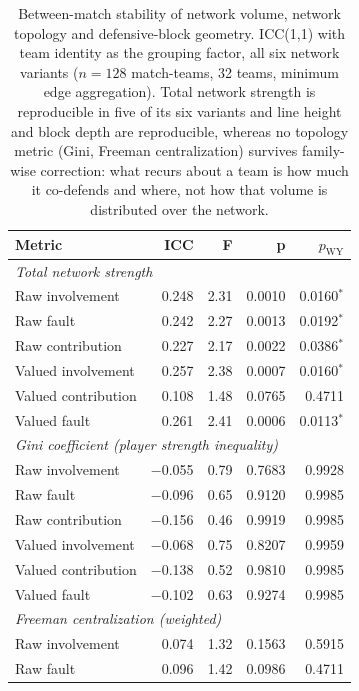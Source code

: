 \begin{table}[ht]
\centering
\caption{Between-match stability of network volume, network topology and
defensive-block geometry. ICC(1,1) with team identity as the grouping factor,
all six network variants ($n=128$ match-teams, 32 teams, minimum
edge aggregation). Total network strength is reproducible in five of its six
variants and line height and block depth are reproducible, whereas no
topology metric (Gini, Freeman centralization) survives family-wise correction:
what recurs about a team is how much it co-defends and where, not how that
volume is distributed over the network.}
\label{tab:net_iccs}
\begin{tabular}{lrrrr}
\toprule
\textbf{Metric} & \textbf{ICC} & \textbf{F} & \textbf{p} & \textbf{$p_{\mathrm{WY}}$} \\
\midrule
\multicolumn{5}{l}{\textit{Total network strength}} \\
\quad Raw involvement & 0.248 & 2.31 & 0.0010 & 0.0160$^{*}$ \\
\quad Raw fault & 0.242 & 2.27 & 0.0013 & 0.0192$^{*}$ \\
\quad Raw contribution & 0.227 & 2.17 & 0.0022 & 0.0386$^{*}$ \\
\quad Valued involvement & 0.257 & 2.38 & 0.0007 & 0.0160$^{*}$ \\
\quad Valued contribution & 0.108 & 1.48 & 0.0765 & 0.4711 \\
\quad Valued fault & 0.261 & 2.41 & 0.0006 & 0.0113$^{*}$ \\
\midrule
\multicolumn{5}{l}{\textit{Gini coefficient (player strength inequality)}} \\
\quad Raw involvement & $-$0.055 & 0.79 & 0.7683 & 0.9928 \\
\quad Raw fault & $-$0.096 & 0.65 & 0.9120 & 0.9985 \\
\quad Raw contribution & $-$0.156 & 0.46 & 0.9919 & 0.9985 \\
\quad Valued involvement & $-$0.068 & 0.75 & 0.8207 & 0.9959 \\
\quad Valued contribution & $-$0.138 & 0.52 & 0.9810 & 0.9985 \\
\quad Valued fault & $-$0.102 & 0.63 & 0.9274 & 0.9985 \\
\midrule
\multicolumn{5}{l}{\textit{Freeman centralization (weighted)}} \\
\quad Raw involvement & 0.074 & 1.32 & 0.1563 & 0.5915 \\
\quad Raw fault & 0.096 & 1.42 & 0.0986 & 0.4711 \\

\end{tabular}
\end{table}
